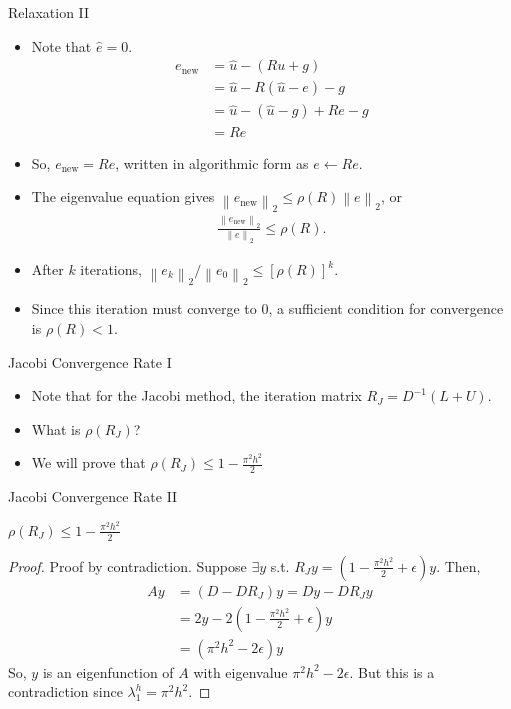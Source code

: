 \documentclass{beamer}
\providecommand{\norm}[1]{\left\lVert #1 \right\rVert}
\begin{document}
\begin{frame}{Relaxation II}
 \begin{itemize}
  \item Note that $\hat{e} = 0$.
  \begin{align}
   e_{\text{new}} &= \hat{u} - (Ru+g) \nonumber \\
                  &= \hat{u} - R(\hat{u}-e) - g \nonumber \\
                  &= \hat{u} - (\hat{u}-g) + Re - g \nonumber \\
                  &= Re
  \end{align}
  \item So, $e_\text{new} = Re$, written in algorithmic form as $e \leftarrow Re$.
  \item The eigenvalue equation gives $\norm{e_\text{new}}_2 \leq \rho(R)\norm{e}_2$, or
  \begin{align}
   \frac{\norm{e_{\text{new}}}_2}{\norm{e}_2} \leq \rho(R).
  \end{align}
  \item After $k$ iterations, $\norm{e_k}_2/\norm{e_0}_2 \leq [\rho(R)]^k$.
  \item Since this iteration must converge to 0, a sufficient condition for
        convergence is $\rho(R) < 1$.
 \end{itemize}
\end{frame}

\begin{frame}{Jacobi Convergence Rate I}
 \begin{itemize}
  \item Note that for the Jacobi method, the iteration matrix $R_J=D^{-1}(L+U)$.
  \item What is $\rho(R_J)$?
  \item We will prove that $\rho(R_J) \leq 1-\frac{\pi^2 h^2}{2}$
 \end{itemize}
\end{frame}

\begin{frame}{Jacobi Convergence Rate II}
 \begin{theorem}
  $\rho(R_J) \leq 1-\frac{\pi^2 h^2}{2}$
   
  \begin{proof}
   Proof by contradiction. Suppose $\exists y$ s.t. $R_Jy = (1-\frac{\pi^2 h^2}{2}+\epsilon)y$.
   Then,
   \begin{align}
    Ay &= (D-DR_J)y = Dy-DR_Jy \nonumber \\
       &= 2y - 2(1-\frac{\pi^2 h^2}{2}+\epsilon)y \nonumber \\
       &= (\pi^2 h^2 - 2 \epsilon) y
   \end{align}
   So, $y$ is an eigenfunction of $A$ with eigenvalue $\pi^2 h^2 - 2 \epsilon$.
   But this is a contradiction since $\lambda^h_1 = \pi^2 h^2$.
  \end{proof}
 \end{theorem}
\end{frame}
\end{document}
